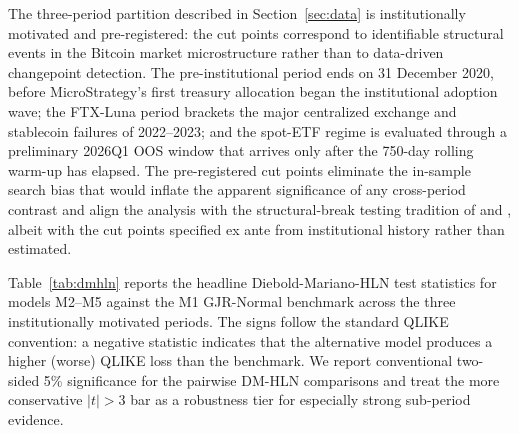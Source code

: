 The three-period partition described in Section~\ref{sec:data} is institutionally motivated and pre-registered: the cut points correspond to identifiable structural events in the Bitcoin market microstructure rather than to data-driven changepoint detection. The pre-institutional period ends on 31 December 2020, before MicroStrategy's first treasury allocation began the institutional adoption wave; the FTX-Luna period brackets the major centralized exchange and stablecoin failures of 2022--2023; and the spot-ETF regime is evaluated through a preliminary 2026Q1 OOS window that arrives only after the 750-day rolling warm-up has elapsed. The pre-registered cut points eliminate the in-sample search bias that would inflate the apparent significance of any cross-period contrast and align the analysis with the structural-break testing tradition of \citet{andrews1993} and \citet{baiperron1998}, albeit with the cut points specified ex ante from institutional history rather than estimated.

Table~\ref{tab:dmhln} reports the headline Diebold-Mariano-HLN test statistics for models M2--M5 against the M1 GJR-Normal benchmark across the three institutionally motivated periods. The signs follow the standard QLIKE convention: a negative statistic indicates that the alternative model produces a higher (worse) QLIKE loss than the benchmark. We report conventional two-sided 5\% significance for the pairwise DM-HLN comparisons and treat the more conservative \citet{harvey2016} $|t| > 3$ bar as a robustness tier for especially strong sub-period evidence.



